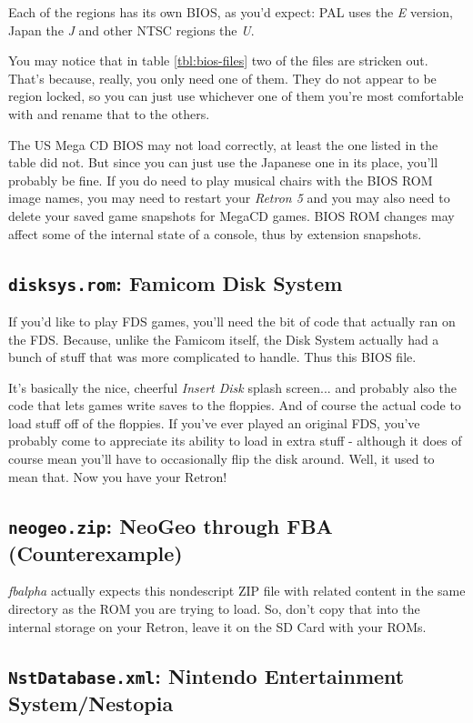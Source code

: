 \documentclass[a4paper]{article}
\begin{document}
Each of the regions has its own BIOS, as you'd expect: PAL uses the \emph{E} version, Japan the \emph{J} and other NTSC regions the \emph{U}.

You may notice that in table \ref{tbl:bios-files} two of the files are stricken out. That's because, really, you only need one of them. They do not appear to be region locked, so you can just use whichever one of them you're most comfortable with and rename that to the others.

The US Mega CD BIOS may not load correctly, at least the one listed in the table did not. But since you can just use the Japanese one in its place, you'll probably be fine. If you do need to play musical chairs with the BIOS ROM image names, you may need to restart your \emph{Retron 5} and you may also need to delete your saved game snapshots for MegaCD games. BIOS ROM changes may affect some of the internal state of a console, thus by extension snapshots.

\subsection{\texttt{disksys.rom}: Famicom Disk System}

If you'd like to play FDS games, you'll need the bit of code that actually ran on the FDS. Because, unlike the Famicom itself, the Disk System actually had a bunch of stuff that was more complicated to handle. Thus this BIOS file.

It's basically the nice, cheerful \emph{Insert Disk} splash screen... and probably also the code that lets games write saves to the floppies. And of course the actual code to load stuff off of the floppies. If you've ever played an original FDS, you've probably come to appreciate its ability to load in extra stuff - although it does of course mean you'll have to occasionally flip the disk around. Well, it used to mean that. Now you have your Retron!

\subsection{\texttt{neogeo.zip}: NeoGeo through FBA (Counterexample)}

\emph{fbalpha} actually expects this nondescript ZIP file with related content in the same directory as the ROM you are trying to load. So, don't copy that into the internal storage on your Retron, leave it on the SD Card with your ROMs.

\subsection{\texttt{NstDatabase.xml}: Nintendo Entertainment System/Nestopia}
\end{document}
